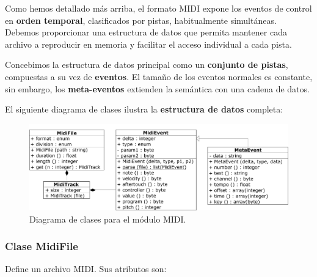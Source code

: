 Como hemos detallado más arriba, el formato \acrshort{MIDI} expone los eventos de control en \textbf{orden temporal}, clasificados por pistas, habitualmente simultáneas. Debemos proporcionar una estructura de datos que permita mantener cada archivo a reproducir en memoria y facilitar el acceso individual a cada pista.

Concebimos la estructura de datos principal como un \textbf{conjunto de pistas}, compuestas a su vez de \textbf{eventos}. El tamaño de los eventos normales es constante, sin embargo, los \textbf{meta-eventos} extienden la semántica con una cadena de datos.

El siguiente diagrama de clases ilustra la \textbf{estructura de datos} completa:

\smallskip

\begin{figure}[H]
	\noindent \begin{centering}
		\includegraphics[width=\linewidth*3/4]{capitulo4/uml_midi}
		\par\end{centering}
	\smallskip
	\caption{\label{fig:uml_midi} Diagrama de clases para el módulo MIDI.}
\end{figure} 

\smallskip

\subsubsection{Clase MidiFile}

Define un archivo \acrshort{MIDI}. Sus atributos son:

